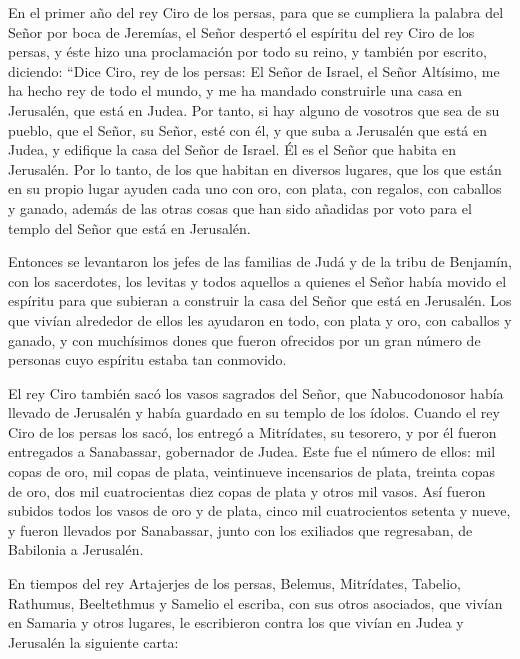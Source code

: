  En el primer año del rey Ciro de los persas, para que se
cumpliera la palabra del Señor por boca de Jeremías,  el
Señor despertó el espíritu del rey Ciro de los persas, y éste hizo una
proclamación por todo su reino, y también por escrito, 
diciendo: ``Dice Ciro, rey de los persas: El Señor de Israel, el Señor
Altísimo, me ha hecho rey de todo el mundo,  y me ha
mandado construirle una casa en Jerusalén, que está en Judea.
 Por tanto, si hay alguno de vosotros que sea de su
pueblo, que el Señor, su Señor, esté con él, y que suba a Jerusalén que
está en Judea, y edifique la casa del Señor de Israel. Él es el Señor
que habita en Jerusalén.  Por lo tanto, de los que habitan
en diversos lugares, que los que están en su propio lugar ayuden cada
uno con oro, con plata,  con regalos, con caballos y
ganado, además de las otras cosas que han sido añadidas por voto para el
templo del Señor que está en Jerusalén.

 Entonces se levantaron los jefes de las familias de Judá
y de la tribu de Benjamín, con los sacerdotes, los levitas y todos
aquellos a quienes el Señor había movido el espíritu para que subieran a
construir la casa del Señor que está en Jerusalén.  Los
que vivían alrededor de ellos les ayudaron en todo, con plata y oro, con
caballos y ganado, y con muchísimos dones que fueron ofrecidos por un
gran número de personas cuyo espíritu estaba tan conmovido.

 El rey Ciro también sacó los vasos sagrados del Señor,
que Nabucodonosor había llevado de Jerusalén y había guardado en su
templo de los ídolos.  Cuando el rey Ciro de los persas
los sacó, los entregó a Mitrídates, su tesorero,  y por
él fueron entregados a Sanabassar, gobernador de Judea. 
Este fue el número de ellos: mil copas de oro, mil copas de plata,
veintinueve incensarios de plata, treinta copas de oro, dos mil
cuatrocientas diez copas de plata y otros mil vasos.  Así
fueron subidos todos los vasos de oro y de plata, cinco mil
cuatrocientos setenta y nueve,  y fueron llevados por
Sanabassar, junto con los exiliados que regresaban, de Babilonia a
Jerusalén.

 En tiempos del rey Artajerjes de los persas, Belemus,
Mitrídates, Tabelio, Rathumus, Beeltethmus y Samelio el escriba, con sus
otros asociados, que vivían en Samaria y otros lugares, le escribieron
contra los que vivían en Judea y Jerusalén la siguiente carta:

